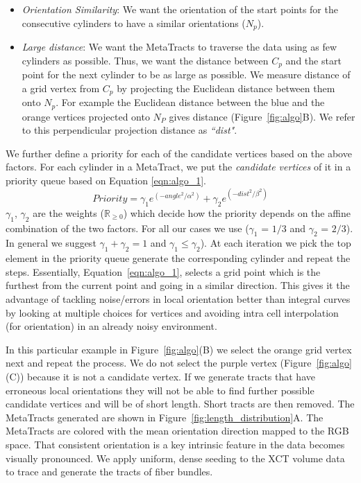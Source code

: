 \begin{itemize}
\item \textit{Orientation Similarity}: We want the orientation of the start points for the consecutive cylinders to have a similar orientations ($N_p$). 
\item \textit{Large distance}: We want the MetaTracts to traverse the data using as few cylinders as possible. Thus, we want the distance between $C_p$ and the start point for the next cylinder to be as large as possible. We measure distance of a grid vertex from $C_p$ by projecting the Euclidean distance between them onto $N_p$. For example the Euclidean distance between the blue and the orange vertices projected onto $N_P$ gives distance (Figure~\ref{fig:algo}B). We refer to this perpendicular projection distance as \textit{``dist"}. 
\end{itemize}
We further define a priority for each of the candidate vertices based on the above factors.
For each cylinder in a MetaTract, we put the \textit{candidate vertices} of it in a priority queue based on Equation \ref{eqn:algo_1}.
\begin{equation}
Priority = \gamma_1 e^{(-angle^2 / \alpha^2)} + \gamma_2e^{(-dist^2 / \beta^2)}
\label{eqn:algo_1}
\end{equation}
$\gamma_1$, $\gamma_2$ are the  weights ($\mathbb{R}_{\ge 0}$)  which decide how the priority depends on the affine combination of the two factors. For all our cases we use ($\gamma_1$ = $1 / 3 $ and $\gamma_2$ = $2 / 3$). In general we suggest $\gamma_1 +\gamma_2 = 1 $ and $\gamma_1 \leq \gamma_2$). At each iteration we pick the top element in the priority queue generate the corresponding cylinder and repeat the steps. Essentially, Equation~\ref{eqn:algo_1}, selects a grid point which is the furthest from the current point and going in a similar direction. This gives it the advantage of tackling noise/errors in local orientation better than integral curves by looking at multiple choices for vertices and avoiding intra cell interpolation (for orientation) in an already noisy environment. 
 
In this particular example in Figure~\ref{fig:algo}(B) we select the orange grid vertex next and repeat the process. We do not select the purple vertex (Figure~\ref{fig:algo}(C)) because it is not a candidate vertex. If we generate tracts that have erroneous local orientations they will not be able to find further possible candidate vertices and will be of short length. Short tracts are then removed. The MetaTracts generated are shown in Figure~\ref{fig:length_distribution}A. The MetaTracts are colored with the mean orientation direction mapped to the RGB space. That consistent orientation is a key intrinsic feature in the data becomes visually pronounced.
We apply uniform, dense seeding to the XCT volume data to trace and generate the tracts of fiber bundles. 
 
